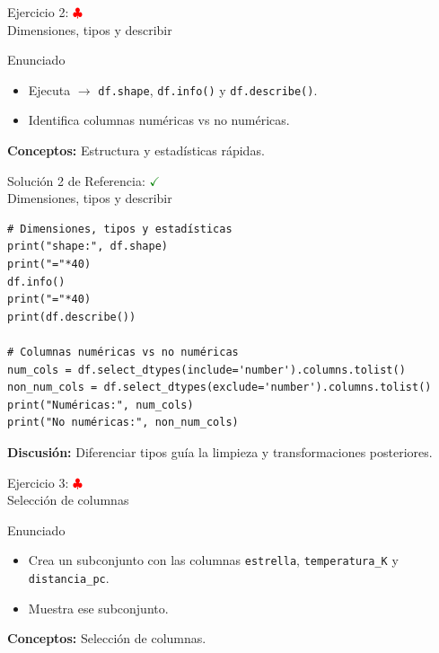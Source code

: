 \documentclass[10pt]{beamer}
\begin{document}
\begin{frame}{Ejercicio 2: \hfill \textcolor{red}{$\clubsuit$} \\ Dimensiones, tipos y describir}
\begin{block}{Enunciado}
  \begin{itemize}
    \item Ejecuta $\rightarrow$ \texttt{df.shape}, \texttt{df.info()} y \texttt{df.describe()}.
    \item Identifica columnas numéricas vs no numéricas.
  \end{itemize}
\end{block}
\textbf{Conceptos:} Estructura y estadísticas rápidas.
\end{frame}

\begin{solutionblock}
\begin{frame}[fragile]{Solución 2 de Referencia: \hfill \textcolor{green}{$\checkmark$} \\ Dimensiones, tipos y describir}
\begin{verbatim}
# Dimensiones, tipos y estadísticas
print("shape:", df.shape)
print("="*40)
df.info()
print("="*40)
print(df.describe())

# Columnas numéricas vs no numéricas
num_cols = df.select_dtypes(include='number').columns.tolist()
non_num_cols = df.select_dtypes(exclude='number').columns.tolist()
print("Numéricas:", num_cols)
print("No numéricas:", non_num_cols)
\end{verbatim}
\textbf{Discusión:} Diferenciar tipos guía la limpieza y transformaciones posteriores.
\end{frame}
\end{solutionblock}

\begin{frame}{Ejercicio 3: \hfill \textcolor{red}{$\clubsuit$} \\ Selección de columnas}
\begin{block}{Enunciado}
  \begin{itemize}
    \item Crea un subconjunto con las columnas \texttt{estrella}, \texttt{temperatura\_K} y \texttt{distancia\_pc}.
    \item Muestra ese subconjunto.
  \end{itemize}
\end{block}
\textbf{Conceptos:} Selección de columnas.
\end{frame}
\end{document}
